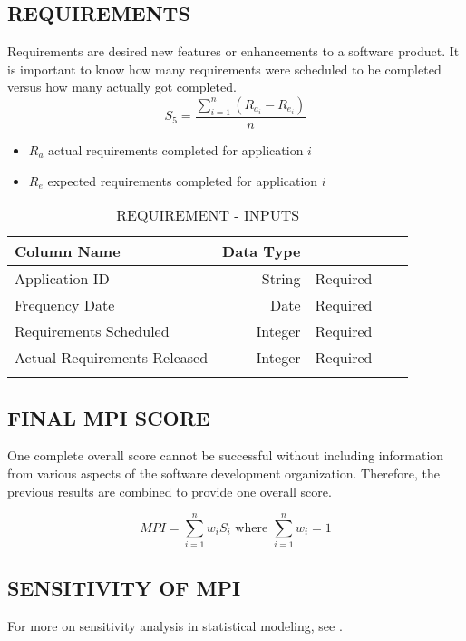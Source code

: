 \documentclass[SDSUThesis.tex]{subfiles}
\begin{document}
\subsection{REQUIREMENTS}
Requirements are desired new features or enhancements to a software product.  It is important to know how many requirements
were scheduled to be completed versus how many actually got completed.  
\[
    S_5 = \frac{\sum^n_{i=1}\left( R_{a_i} - R_{e_i} \right)}{n}
\]
\begin{itemize}
\item $R_a$ actual requirements completed for application $i$
\item $R_e$ expected requirements completed for application $i$
\end{itemize}

\begin{longtable}{@{}l rr rr}

\toprule%
 \centering%
 {\bfseries Column Name}
 & {\bfseries Data Type}
 &  \\

\cmidrule[0.4pt](r{0.125em}){1-1}%
\cmidrule[0.4pt](lr{0.125em}){2-2}%
\cmidrule[0.4pt](l{0.125em}){3-3}%
\endhead

Application ID & String  & Required \\
\myrowcolour%
Frequency Date & Date & Required \\
Requirements Scheduled & Integer & Required \\
\myrowcolour%
Actual Requirements Released & Integer  & Required \\

\bottomrule

\caption{REQUIREMENT - INPUTS}
\label{tab:req}
\end{longtable}

\subsection{FINAL MPI SCORE}
One complete overall score cannot be successful without including information from various aspects of the software development organization.  Therefore, the previous results
are combined to provide one overall score.

\[
    MPI =\sum\limits^n_{i=1} w_i S_i \text{ where } \sum\limits^n_{i=1} w_i = 1
\]


\subsection{SENSITIVITY OF MPI}

For more on sensitivity analysis in statistical modeling, see \cite{Saltelli2000}.
\end{document}
